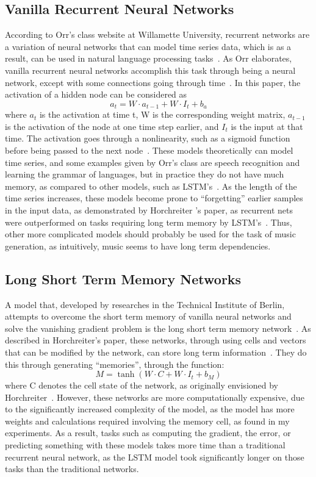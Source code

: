 \documentclass[12pt, titlepage]{article}
\begin{document}
\subsection{Vanilla Recurrent Neural Networks}
According to Orr's class website at Willamette University, recurrent networks
are a variation of neural networks that can model time series data, which is as
a result, can be used in natural language processing tasks~\cite{rnnintro}. As
Orr elaborates, vanilla recurrent neural networks accomplish this task through
being a neural network, except with some connections going through
time~\cite{rnnintro}. In this paper, the activation of a hidden node can be considered as
$$a_t = W\cdot a_{t-1} + W\cdot I_t + b_a$$
where $a_t$ is the activation at time t, W is the corresponding weight matrix,
$a_{t-1}$ is the activation of the node at one time step earlier, and $I_t$ is
the input at that time. The activation goes through a nonlinearity, such as a
sigmoid function before being passed to the next node~\cite{rnnintro}. These
models theoretically can model time series, and some examples given by Orr's
class are speech recognition and learning the grammar of languages, but in
practice they do not have much memory, as compared to other models, such as
LSTM's~\cite{rnnintro}\cite{lstm}. As the length of the time series increases,
these models become prone to ``forgetting'' earlier samples in the input data,
as demonstrated by Horchreiter 's paper, as recurrent nets were outperformed on
tasks requiring long term memory by LSTM's~\cite{lstm}. Thus, other more
complicated models should probably be used for the task of music generation, as
intuitively, music seems to have long term dependencies.


\subsection{Long Short Term Memory Networks}
A model that, developed by researches in the Technical Institute of Berlin,
attempts to overcome the short term memory of vanilla neural networks and solve
the vanishing gradient problem is the long short term memory
network~\cite{lstm}. As described in Horchreiter's paper, these networks,
through using cells and vectors that can be modified by the network, can store
long term information~\cite{lstm}. They do this through generating ``memories'',
through the function:
$$M = \tanh(W\cdot C + W\cdot I_t + b_M)$$
where C denotes the cell state of the network, as originally envisioned by
Horchreiter~\cite{lstm}. However, these networks are more computationally
expensive, due to the significantly increased complexity of the model, as the
model has more weights and calculations required involving the memory cell, as
found in my experiments. As a result, tasks such as computing the gradient, the
error, or predicting something with these models takes more time than a
traditional recurrent neural network, as the LSTM model took significantly
longer on those tasks than the traditional networks.
\end{document}
